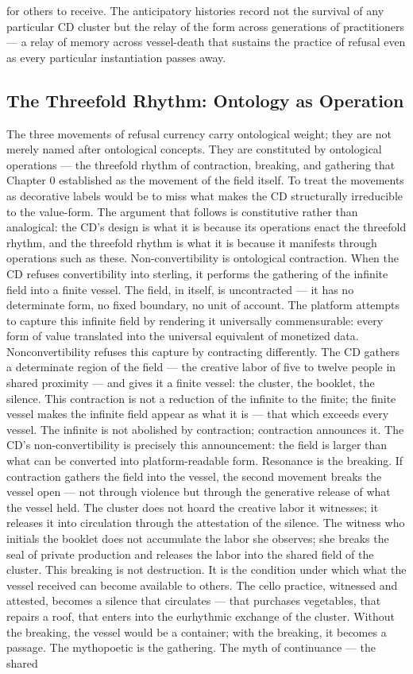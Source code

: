 for others to receive. The anticipatory histories record not the survival of any particular CD cluster but the relay of the form across generations of practitioners — a relay of memory across vessel-death that sustains the practice of refusal even as every particular instantiation passes away.

\subsection{The Threefold Rhythm: Ontology as Operation}

The three movements of refusal currency carry ontological weight; they are not merely named after ontological concepts. They are constituted by ontological operations — the threefold rhythm of contraction, breaking, and gathering that Chapter 0 established as the movement of the field itself. To treat the movements as decorative labels would be to miss what makes the CD structurally irreducible to the value-form. The argument that follows is constitutive rather than analogical: the CD’s design is what it is because its operations enact the threefold rhythm, and the threefold rhythm is what it is because it manifests through operations such as these. Non-convertibility is ontological contraction. When the CD refuses convertibility into sterling, it performs the gathering of the infinite field into a finite vessel. The field, in itself, is uncontracted — it has no determinate form, no fixed boundary, no unit of account. The platform attempts to capture this infinite field by rendering it universally commensurable: every form of value translated into the universal equivalent of monetized data. Nonconvertibility refuses this capture by contracting differently. The CD gathers a determinate region of the field — the creative labor of five to twelve people in shared proximity — and gives it a finite vessel: the cluster, the booklet, the silence. This contraction is not a reduction of the infinite to the finite; the finite vessel makes the infinite field appear as what it is — that which exceeds every vessel. The infinite is not abolished by contraction; contraction announces it. The CD’s non-convertibility is precisely this announcement: the field is larger than what can be converted into platform-readable form. Resonance is the breaking. If contraction gathers the field into the vessel, the second movement breaks the vessel open — not through violence but through the generative release of what the vessel held. The cluster does not hoard the creative labor it witnesses; it releases it into circulation through the attestation of the silence. The witness who initials the booklet does not accumulate the labor she observes; she breaks the seal of private production and releases the labor into the shared field of the cluster. This breaking is not destruction. It is the condition under which what the vessel received can become available to others. The cello practice, witnessed and attested, becomes a silence that circulates — that purchases vegetables, that repairs a roof, that enters into the eurhythmic exchange of the cluster. Without the breaking, the vessel would be a container; with the breaking, it becomes a passage. The mythopoetic is the gathering. The myth of continuance — the shared 